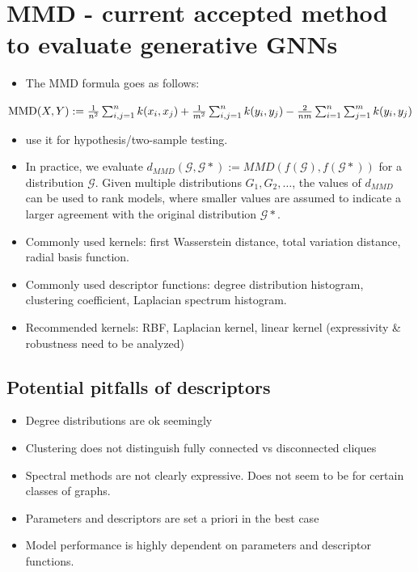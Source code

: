 \documentclass[12pt]{article}
\begin{document}
\section{MMD - current accepted method to evaluate generative GNNs}
\label{sec:org5c236b1}
\begin{itemize}
\item The MMD formula goes as follows:
\end{itemize}
\(\text{MMD}(X, Y) := {1\over n^2} \sum_{i,j=1}^{n}k(x_i, x_j) + {1\over m^2} \sum_{i,j=1}^{n}k(y_i, y_j) - {2\over nm} \sum_{i=1}^{n}\sum_{j=1}^{m}k(y_i, y_j)\)
\begin{itemize}
\item use it for hypothesis/two-sample testing.
\item In practice, we evaluate \(d_{MMD}(\mathcal{G},\mathcal{G*}) :=
  MMD(f(\mathcal{G}),f(\mathcal{G}*))\) for a distribution \(\mathcal{G}\). Given
multiple distributions \(G_1, G_2, \hdots\), the values of \(d_{MMD}\) can be used
to rank models, where smaller values are assumed to indicate a larger
agreement with the original distribution \(\mathcal{G}*\).
\item Commonly used kernels: first Wasserstein distance, total variation distance,
radial basis function.
\item Commonly used descriptor functions: degree distribution histogram, clustering
coefficient, Laplacian spectrum histogram.
\item Recommended kernels: RBF, Laplacian kernel, linear kernel (expressivity \& robustness need to be analyzed)
\end{itemize}
\subsection{Potential pitfalls of descriptors}
\label{sec:orga10a6cd}
\begin{itemize}
\item Degree distributions are ok seemingly
\item Clustering does not distinguish fully connected vs disconnected cliques
\item Spectral methods are not clearly expressive. Does not seem to be for certain classes of graphs.
\item Parameters and descriptors are set a priori in the best case
\item Model performance is highly dependent on parameters and descriptor functions.
\end{itemize}
\end{document}
